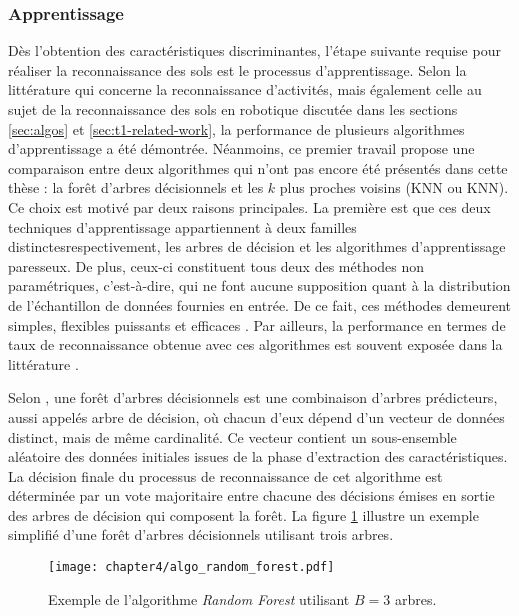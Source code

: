 \subsubsection{Apprentissage}

Dès l'obtention des caractéristiques discriminantes, l'étape suivante requise pour réaliser la reconnaissance des sols est le processus d'apprentissage. Selon la littérature qui concerne la reconnaissance d'activités, mais également celle au sujet de la reconnaissance des sols en robotique discutée dans les sections \ref{sec:algos} et \ref{sec:t1-related-work}, la performance de plusieurs algorithmes d'apprentissage a été démontrée. Néanmoins, ce premier travail propose une comparaison entre deux algorithmes qui n'ont pas encore été présentés dans cette thèse : la forêt d'arbres décisionnels et les $k$ plus proches voisins (\acl{KNN} ou \acs{KNN}). Ce choix est motivé par deux raisons principales. La première est que ces deux techniques d'apprentissage appartiennent à deux familles distinctes\textemdash respectivement, les arbres de décision et les algorithmes d'apprentissage \og{}paresseux\fg{}. De plus, ceux-ci constituent tous deux des méthodes non paramétriques, c'est-à-dire, qui ne font aucune supposition quant à la distribution de l'échantillon de données fournies en entrée. De ce fait, ces méthodes demeurent simples, flexibles puissants et efficaces \citep{Russell2010}. Par ailleurs, la performance en termes de taux de reconnaissance obtenue avec ces algorithmes est souvent exposée dans la littérature \citep{Kertesz2016, Vail2004}.

Selon \cite{Breiman2001}, une forêt d'arbres décisionnels est une combinaison d'arbres prédicteurs, aussi appelés arbre de décision, où chacun d'eux dépend d'un vecteur de données distinct, mais de même cardinalité. Ce vecteur contient un sous-ensemble aléatoire des données initiales issues de la phase d'extraction des caractéristiques. La décision finale du processus de reconnaissance de cet algorithme est déterminée par un vote majoritaire entre chacune des décisions émises en sortie des arbres de décision qui composent la forêt. La figure \ref{fig:algo_random_forest} illustre un exemple simplifié d'une forêt d'arbres décisionnels utilisant trois arbres.

\begin{figure}[H]
	\centering
	\texttt{[image: chapter4/algo\_random\_forest.pdf]}
        \caption{Exemple de l'algorithme \textit{Random Forest} utilisant $B=3$ arbres.}
	\label{fig:algo_random_forest}
\end{figure}

